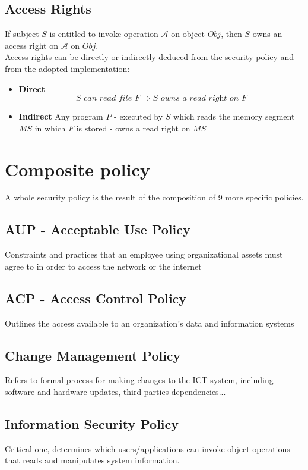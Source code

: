 \subsection{Access Rights}
If subject $S$ is entitled to invoke operation $\mathcal{A}$ on object $Obj$, then $S$ owns an access right on $\mathcal{A}$ on $Obj$.\\
Access rights can be directly or indirectly deduced from the security policy and from the adopted implementation:
\begin{itemize}
    \item \textbf{Direct} 
    \[S \textit{ can read file } F \Rightarrow S \textit{ owns a read right on } F\]
    \item \textbf{Indirect}
    Any program $P$ {-} executed by $S$ which reads the memory segment $MS$ in which $F$ is stored {-} owns a read right on $MS$
\end{itemize}

\section{Composite policy}
A whole security policy is the result of the composition of 9 more specific policies.
\subsection*{AUP - Acceptable Use Policy}
Constraints and practices that an employee using organizational assets must agree to in order to access the network or the internet
\subsection*{ACP - Access Control Policy}
Outlines the access available to an organization’s data and
information systems
\subsection*{Change Management Policy}
Refers to formal process for making changes to the ICT system,
including software and hardware updates, third parties dependencies...
\subsection*{Information Security Policy}
Critical one, determines which users/applications can invoke object operations that reads and manipulates system information.

